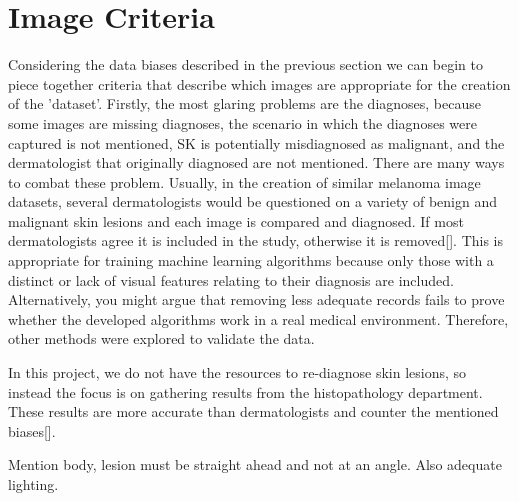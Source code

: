 \section{Image Criteria}
Considering the data biases described in the previous section we can begin to piece together criteria that describe which images are appropriate for the creation of the 'dataset'. Firstly, the most glaring problems are the diagnoses, because some images are missing diagnoses, the scenario in which the diagnoses were captured is not mentioned, SK is potentially misdiagnosed as malignant, and the dermatologist that originally diagnosed are not mentioned. There are many ways to combat these problem. Usually, in the creation of similar melanoma image datasets, several dermatologists would be questioned on a variety of benign and malignant skin lesions and each image is compared and diagnosed. If most dermatologists agree it is included in the study, otherwise it is removed[]. This is appropriate for training machine learning algorithms because only those with a distinct or lack of visual features relating to their diagnosis are included. Alternatively, you might argue that removing less adequate records fails to prove whether the developed algorithms work in a real medical environment. Therefore, other methods were explored to validate the data.

In this project, we do not have the resources to re-diagnose skin lesions, so instead the focus is on gathering results from the histopathology department. These results are more accurate than dermatologists and counter the mentioned biases[]. 

Mention body, lesion must be straight ahead and not at an angle. Also adequate lighting.
